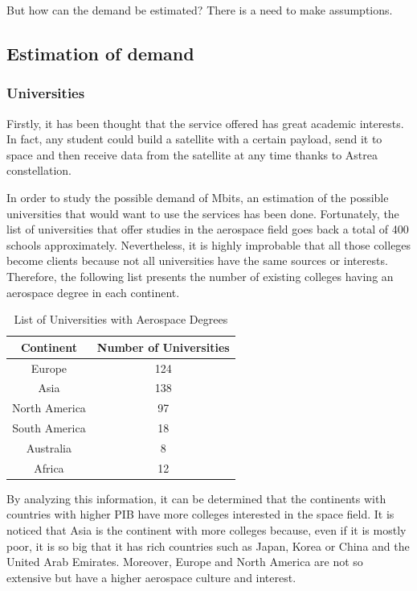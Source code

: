 But how can the demand be estimated? There is a need to make assumptions. 

\subsection{Estimation of demand}

\subsubsection{Universities}
Firstly, it has been thought that the service offered has great academic interests. In fact, any student could build a satellite with a certain payload, send it to space and then receive data from the satellite at any time thanks to Astrea constellation. 

In order to study the possible demand of Mbits, an estimation of the possible universities that would want to use the services has been done. Fortunately, the list of universities that offer studies in the aerospace field goes back a total of 400 schools approximately. Nevertheless, it is highly improbable that all those colleges become clients because not all universities have the same sources or interests. Therefore, the following list presents the number of existing colleges having an aerospace degree in each continent.

	\begin{table}[H]
	\begin{center}
	\begin{tabular}{|c|c|}
	\bf{Continent} & \bf{Number of Universities}\\
	\hline 
	Europe & 124\\
	\hline 
	Asia & 138\\
	\hline 
	North America &  97\\
	\hline
	 South America & 18\\
	\hline 
	Australia & 8\\
	\hline 
	Africa & 12\\
	\end{tabular}
	\end{center}
	\caption{List of Universities with Aerospace Degrees}
	\end{table} 	

By analyzing this information, it can be determined that the continents with countries with higher PIB have more colleges interested in the space field. It is noticed that Asia is the continent with more colleges because, even if it is mostly poor, it is so big that it has rich countries such as Japan, Korea or China and the United Arab Emirates. Moreover, Europe and North America are not so extensive but have a higher aerospace culture and interest. 

